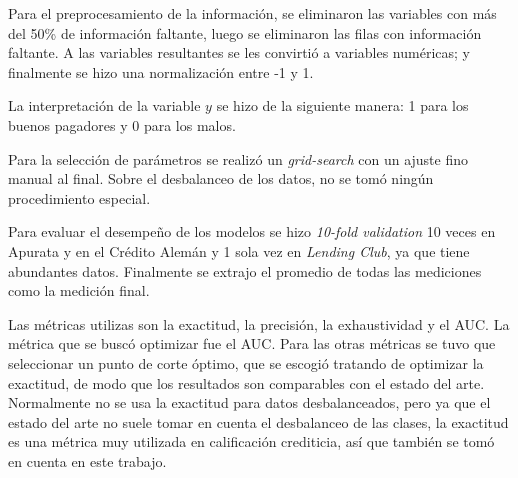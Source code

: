 Para el preprocesamiento de la información, se eliminaron las variables con más del 50\% de información faltante, luego se eliminaron las filas con información faltante. A las variables resultantes se les convirtió a variables numéricas; y finalmente se hizo una normalización entre -1 y 1.

La interpretación de la variable $y$ se hizo de la siguiente manera: 1 para los buenos pagadores y 0 para los malos.

Para la selección de parámetros se realizó un \textit{grid-search} con un ajuste fino manual al final. Sobre el desbalanceo de los datos, no se tomó ningún procedimiento especial.

Para evaluar el desempeño de los modelos se hizo \textit{10-fold validation} 10 veces en Apurata y en el Crédito Alemán y 1 sola vez en \textit{Lending Club}, ya que tiene abundantes datos. Finalmente se extrajo el promedio de todas las mediciones como la medición final.

Las métricas utilizas son la exactitud, la precisión, la exhaustividad y el \ac{AUC}. La métrica que se buscó optimizar fue el \ac{AUC}. Para las otras métricas se tuvo que seleccionar un punto de corte óptimo, que se escogió tratando de optimizar la exactitud, de modo que los resultados son comparables con el estado del arte. Normalmente no se usa la exactitud para datos desbalanceados, pero ya que el estado del arte no suele tomar en cuenta el desbalanceo de las clases, la exactitud es una métrica muy utilizada en calificación crediticia, así que también se tomó en cuenta en este trabajo.


